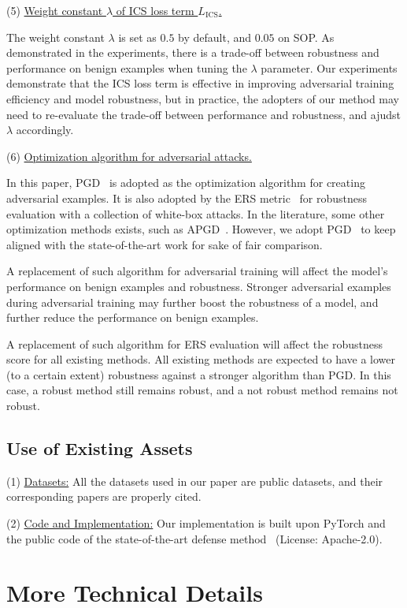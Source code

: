 (5) \ul{Weight constant $\lambda$ of ICS loss term $L_\text{ICS}$.}

The weight constant $\lambda$ is set as $0.5$ by default, and $0.05$ on SOP.
%
As demonstrated in the experiments, there is a trade-off between robustness and
performance on benign examples when tuning the $\lambda$ parameter.
%
Our experiments demonstrate that the ICS loss term is effective in improving
adversarial training efficiency and model robustness, but in practice, the
adopters of our method may need to re-evaluate the trade-off between
performance and robustness, and ajudst $\lambda$ accordingly.

(6) \ul{Optimization algorithm for adversarial attacks.}

In this paper, PGD~\cite{madry} is adopted as the optimization algorithm for
creating adversarial examples.
%
It is also adopted by the ERS metric~\cite{robrank} for robustness evaluation
with a collection of white-box attacks.
%
In the literature, some other optimization methods exists, such as
APGD~\cite{apgd}.
%
However, we adopt PGD~\cite{madry} to keep aligned with the state-of-the-art
work for sake of fair comparison.

A replacement of such algorithm for adversarial training will affect the
model's performance on benign examples and robustness.
%
Stronger adversarial examples during adversarial training may further boost the
robustness of a model, and further reduce the performance on benign examples.

A replacement of such algorithm for ERS evaluation will affect the robustness
score for all existing methods.
%
All existing methods are expected to have a lower (to a certain extent)
robustness against a stronger algorithm than PGD.
%
In this case, a robust method still remains robust, and a not robust method
remains not robust.

\subsection{Use of Existing Assets}

(1) \ul{Datasets:} All the datasets used in our paper are public datasets,
and their corresponding papers are properly cited.

(2) \ul{Code and Implementation:} Our implementation is built upon PyTorch
and the public code of the state-of-the-art defense method~\cite{robrank}
(License: Apache-2.0).

\section{More Technical Details}
\label{sec:b}

